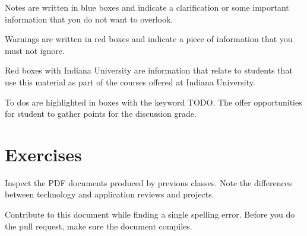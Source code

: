 \begin{NOTE}
Notes are written in blue boxes and indicate a clarification or some
important information that you do not want to overlook.
\end{NOTE}

\begin{WARNING}
Warnings are written in red  boxes and indicate a piece of information
that you must not ignore.
\end{WARNING}

\begin{IU}
Red boxes with Indiana University are information that relate to
students that use this material as part of the courses offered at
Indiana University.
\end{IU}

To dos are highlighted in boxes with the keyword TODO. The offer
opportunities for student to gather points for the discussion grade.


\section{Exercises}
\bigskip

\begin{exercise}
\label{E:Preface.1} 
Inspect the PDF documents produced by previous
classes. Note the differences between technology and application
reviews and projects. 
\end{exercise}

\begin{exercise}
\label{E:Preface.2}
 Contribute to this document while finding a
  single spelling error. Before you do the pull request, make sure the
  document compiles.
\end{exercise}


